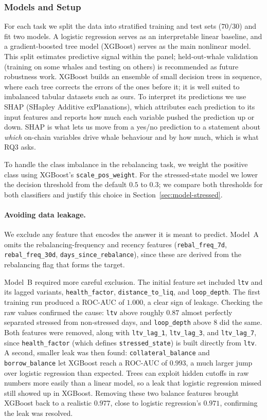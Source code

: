 \subsubsection{Models and Setup}
\label{sec:ml-setup}

For each task we split the data into stratified training and test sets
($70/30$) and fit two models. A logistic regression serves as an
interpretable linear baseline, and a gradient-boosted tree model
(XGBoost) serves as the main nonlinear model. This split estimates
predictive signal within the panel; held-out-whale validation (training
on some whales and testing on others) is recommended as future
robustness work. XGBoost builds an ensemble
of small decision trees in sequence, where each tree corrects the errors
of the ones before it; it is well suited to imbalanced tabular datasets
such as ours. To interpret its predictions we use SHAP (SHapley Additive
exPlanations), which attributes each prediction to its input features and
reports how much each variable pushed the prediction up or down. SHAP is
what lets us move from a yes/no prediction to a statement about
\emph{which} on-chain variables drive whale behaviour and by how much,
which is what RQ3 asks.

To handle the class imbalance in the rebalancing task, we weight the
positive class using XGBoost's \texttt{scale\_pos\_weight}. For the
stressed-state model we lower the decision threshold from the default
$0.5$ to $0.3$; we compare both thresholds for both classifiers and
justify this choice in Section~\ref{sec:model-stressed}.

\paragraph{Avoiding data leakage.}
We exclude any feature that encodes the answer it is meant to predict.
Model~A omits the rebalancing-frequency and recency features
(\texttt{rebal\_freq\_7d}, \texttt{rebal\_freq\_30d},
\texttt{days\_since\_rebalance}), since these are derived from the
rebalancing flag that forms the target.

Model~B required more careful exclusion. The initial feature set included
\texttt{ltv} and its lagged variants, \texttt{health\_factor},
\texttt{distance\_to\_liq}, and \texttt{loop\_depth}. The first training
run produced a ROC-AUC of $1.000$, a clear sign of leakage. Checking the
raw values confirmed the cause: \texttt{ltv} above roughly $0.87$ almost
perfectly separated stressed from non-stressed days, and
\texttt{loop\_depth} above $8$ did the same. Both features were removed,
along with \texttt{ltv\_lag\_1}, \texttt{ltv\_lag\_3}, and
\texttt{ltv\_lag\_7}, since \texttt{health\_factor} (which defines
\texttt{stressed\_state}) is built directly from \texttt{ltv}. A second,
smaller leak was then found: \texttt{collateral\_balance} and
\texttt{borrow\_balance} let XGBoost reach a ROC-AUC of $0.993$, a much
larger jump over logistic regression than expected. Trees can exploit
hidden cutoffs in raw numbers more easily than a linear model, so a leak
that logistic regression missed still showed up in XGBoost. Removing
these two balance features brought XGBoost back to a realistic $0.977$,
close to logistic regression's $0.971$, confirming the leak was resolved.

